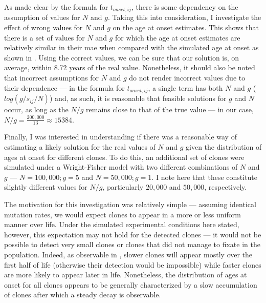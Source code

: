 As made clear by the formula for $t_{onset,ij}$, there is some dependency on the assumption of values for $N$ and $g$. Taking this into consideration, I investigate the effect of wrong values for $N$ and $g$ on the age at onset estimates. This shows that there is a set of values for $N$ and $g$ for which the age at onset estimates are relatively similar in their \ac{mae} when compared with the simulated age at onset as shown in . Using the correct values, we can be sure that our solution is, on average, within 8.72 years of the real value. Nonetheless, it should also be noted that incorrect assumptions for $N$ and $g$ do not render incorrect values due to their dependence --- in the formula for $t_{onset,ij}$, a single term has both $N$ and $g$ ($log(g/s_{ij}/N)$) and, as such, it is reasonable that feasible solutions for $g$ and $N$ occur, as long as the $N/g$ remains close to that of the true value --- in our case, $N/g = \frac{200,000}{13} \approx 15384$.

\begin{figure}[h]
	\label{fig:age-at-onset-mae}
\end{figure}

Finally, I was interested in understanding if there was a reasonable way of estimating a likely solution for the real values of $N$ and $g$ given the distribution of ages at onset for different clones. To do this, an additional set of clones were simulated under a Wright-Fisher model with two different combinations of $N$ and $g$ --- $N=100,000;g=5$ and $N=50,000;g=1$. I note here that these constitute slightly different values for $N/g$, particularly $20,000$ and $50,000$, respectively. 

The motivation for this investigation was relatively simple --- assuming identical mutation rates, we would expect clones to appear in a more or less uniform manner over life. Under the simulated experimental conditions here stated, however, this expectation may not hold for the detected clones --- it would not be possible to detect very small clones or clones that did not manage to fixate in the population. Indeed, as observable in , slower clones will appear mostly over the first half of life (otherwise their detection would be impossible) while faster clones are more likely to appear later in life. Nonetheless, the distribution of ages at onset for all clones appears to be generally characterized by a slow accumulation of clones after which a steady decay is observable.


